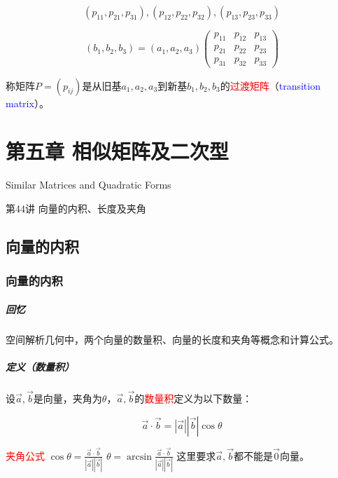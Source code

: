 \documentclass[UTF8]{ctexbook}
\begin{document}
\begin{displaymath}
(p_ {11},p_{21},p_{31}),(p_{12},p_{22},p_{32}),(p_{13},p_{23},p_{33})
\end{displaymath}

\begin{displaymath}
(b_{1},b_{2},b_{3})=(a_{1},a_{2},a_{3})
\begin{pmatrix}
p_ {11} & p_{12} & p_{13} \\
p_ {21} & p_{22} & p_{23} \\
p_ {31} & p_{32} & p_{33}
\end{pmatrix}
\end{displaymath}

称矩阵$P=(p_{ij})$是从旧基$a_{1},a_{2},a_{3}$到新基$b_{1},b_{2},b_{3}$的\textcolor{red}{过渡矩阵}（\textcolor{blue}{transition matrix}）。

\chapter{第五章 相似矩阵及二次型 }

Similar Matrices and Quadratic Forms

第44讲 向量的内积、长度及夹角

\section{向量的内积}

\subsection{向量的内积}

\paragraph{回忆} 空间解析几何中，两个向量的数量积、向量的长度和夹角等概念和计算公式。

\paragraph{定义（数量积）} 设$\vec{a},\vec{b}$是向量，夹角为$\theta$，$\vec{a},\vec{b}$的\textcolor{red}{数量积}定义为以下数量：

\begin{displaymath}
\vec{a} \cdot \vec{b} = |\vec{a}| |\vec{b}| \cos \theta
\end{displaymath}

\textcolor{red}{夹角公式} $\cos \theta=\frac{\vec{a} \cdot \vec{b}}{|\vec{a}| |\vec{b}|}$ \quad $\theta = \arcsin \frac{\vec{a} \cdot \vec{b}}{|\vec{a}| |\vec{b}|}$ \quad 这里要求$\vec{a},\vec{b}$都不能是$\vec{0}$向量。\\
\end{document}
